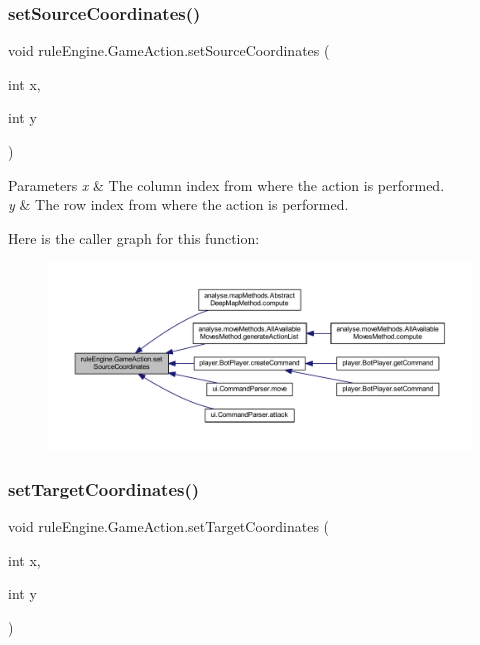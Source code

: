 \subsubsection{\texorpdfstring{set\+Source\+Coordinates()}{setSourceCoordinates()}}
{\footnotesize\ttfamily void rule\+Engine.\+Game\+Action.\+set\+Source\+Coordinates (\begin{DoxyParamCaption}\item[{int}]{x,  }\item[{int}]{y }\end{DoxyParamCaption})\hspace{0.3cm}{\ttfamily [inline]}}


\begin{DoxyParams}{Parameters}
{\em x} & The column index from where the action is performed. \\
\hline
{\em y} & The row index from where the action is performed. \\
\hline
\end{DoxyParams}
Here is the caller graph for this function\+:
\nopagebreak
\begin{figure}[H]
\begin{center}
\leavevmode
\includegraphics[width=350pt]{classrule_engine_1_1_game_action_a606ab317d79faf03aba37638bdc23cd6_icgraph}
\end{center}
\end{figure}
\mbox{\label{classrule_engine_1_1_game_action_ace03895cc8a7061ecd2af09156cead26}} 
\subsubsection{\texorpdfstring{set\+Target\+Coordinates()}{setTargetCoordinates()}}
{\footnotesize\ttfamily void rule\+Engine.\+Game\+Action.\+set\+Target\+Coordinates (\begin{DoxyParamCaption}\item[{int}]{x,  }\item[{int}]{y }\end{DoxyParamCaption})\hspace{0.3cm}{\ttfamily [inline]}}


